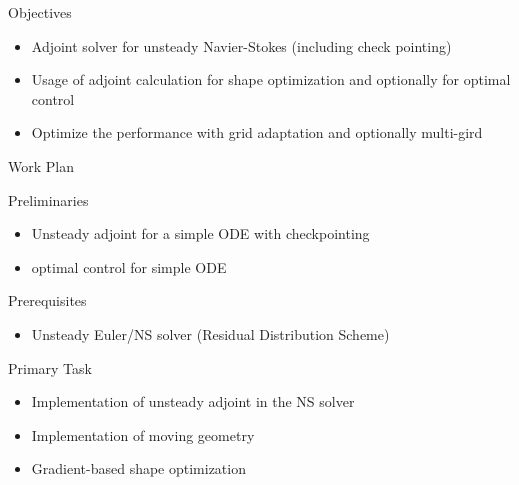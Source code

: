 
% 
\newcommand{\ltx}[1]{{\tt \textbackslash#1}}


\begin{frame}{Objectives}
\begin{block}{}
\begin{itemize}
\item Adjoint solver for unsteady Navier-Stokes (including check pointing)
\item Usage of adjoint calculation for shape optimization and optionally for optimal control
\item Optimize the performance with grid adaptation and optionally multi-gird
\end{itemize}
\end{block}
\end{frame}

\begin{frame}{Work Plan}

\begin{block}{Preliminaries}
\begin{itemize}\item Unsteady adjoint for a simple ODE with checkpointing
\item optimal control for simple ODE
\end{itemize}
\end{block}



\begin{block}{Prerequisites}
\begin{itemize}
\item Unsteady Euler/NS solver (Residual Distribution Scheme)
\end{itemize}
\end{block}

\begin{block}{Primary Task}
\begin{itemize}
\item Implementation of unsteady adjoint in the NS solver
\item Implementation of moving geometry
\item Gradient-based shape optimization
\end{itemize}
\end{block}

\end{frame}

